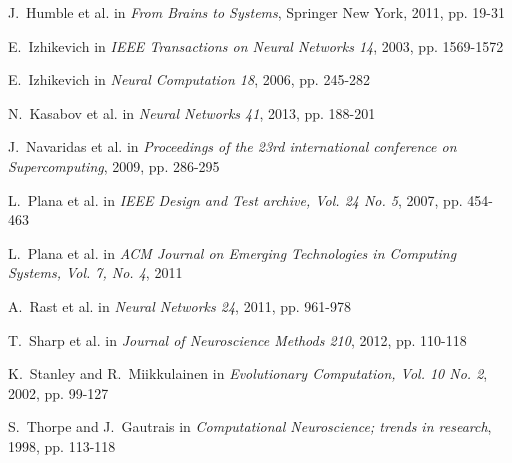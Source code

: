 \documentclass[journal]{./sty/IEEEtran}
\begin{document}
\begin{thebibliography}{22}
J.~Humble et al. in \emph{From Brains to Systems}, Springer New York, 2011, pp. 19-31

E.~Izhikevich in \emph{IEEE Transactions on Neural Networks 14}, 2003, pp. 1569-1572

E.~Izhikevich in \emph{Neural Computation 18}, 2006, pp. 245-282

N.~Kasabov et al. in \emph{Neural Networks 41}, 2013, pp. 188-201

J.~Navaridas et al. in \emph{Proceedings of the 23rd international conference on Supercomputing}, 2009, pp. 286-295 

L.~Plana et al. in \emph{IEEE Design and Test archive, Vol. 24 No. 5}, 2007, pp. 454-463

L.~Plana et al. in \emph{ACM Journal on Emerging Technologies in Computing Systems, Vol. 7, No. 4}, 2011

A.~Rast et al. in \emph{Neural Networks 24}, 2011, pp. 961-978

T.~Sharp et al. in \emph{Journal of Neuroscience Methods 210}, 2012, pp. 110-118

K.~Stanley and R.~Miikkulainen in \emph{Evolutionary Computation, Vol. 10 No. 2}, 2002, pp. 99-127

S.~Thorpe and J.~Gautrais in \emph{Computational Neuroscience; trends in research}, 1998, pp. 113-118

\end{thebibliography}
\end{document}
